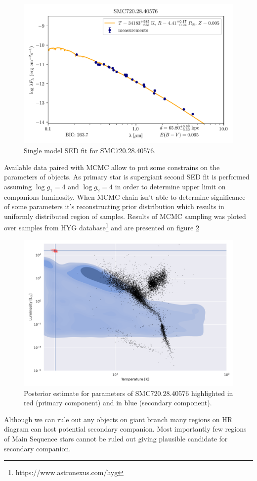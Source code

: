 \documentclass{pracalicmgr}
\begin{document}
\begin{figure}[H]
    \centering
    \includegraphics[scale=1]{plots/SMC720.28.40576_simple_emcee.png}
    \caption{Single model SED fit for SMC720.28.40576.}
    \label{SMC720:sed}
\end{figure}
Available data paired with MCMC allow to put some constrains on the parameters of objects. As primary star is supergiant
second SED fit is performed assuming $\log g_1=4$ and $\log g_2=4$ in order to determine upper limit on companions luminosity. 
When MCMC chain isn't able to determine significance of some parameters it's reconstructing prior distribution 
which results in uniformly distributed region of samples. Results of MCMC sampling was ploted over samples from HYG
 database\footnote{https://www.astronexus.com/hyg} and are presented on figure \ref{posterior}
\begin{figure}[H]
    \includegraphics[scale=0.6]{plots/posterior_estimate_SMC720.png}
    \caption{Posterior estimate for parameters of SMC720.28.40576 highlighted in red (primary component)
    and in blue (secondary component).}\label{posterior}
\end{figure}
Although we can rule out any objects on giant branch many regions on HR diagram can host potential secondary companion. Most importantly
few regions of Main Sequence stars cannot be ruled out giving plausible candidate for secondary companion.
\end{document}
